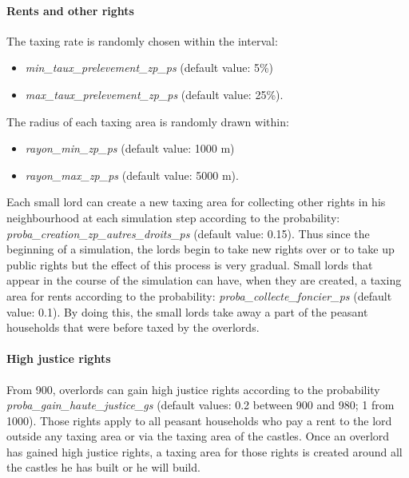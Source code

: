 \documentclass[a4paper,11pt]{article}
\begin{document}
{\paragraph{Rents and other rights}
\begin{sloppypar}
The taxing rate is randomly chosen within the interval:
\begin{itemize}
  \item \textit{min\_taux\_prelevement\_zp\_ps} (default value: 5\%)
  \item \textit{max\_taux\_prelevement\_zp\_ps} (default value: 25\%).
\end{itemize}
The radius of each taxing area is randomly drawn within:
\begin{itemize}
  \item \textit{rayon\_min\_zp\_ps} (default value: 1000 m)
  \item   \textit{rayon\_max\_zp\_ps} (default value: 5000 m).
\end{itemize}
Each small lord can create a new taxing area for collecting other rights in his neighbourhood at each simulation step according to the probability:
\textit{proba\_creation\_zp\_autres\_droits\_ps} (default value: 0.15). Thus since the beginning of a simulation, the lords begin to take new rights over or to take up public rights but the effect of this process is very gradual. Small lords that appear in the course of the simulation can have, when they are created, a taxing area for rents according to the probability:
\textit{proba\_collecte\_foncier\_ps} (default value: 0.1). By doing this, the small lords take away a part of the peasant households that were before taxed by the overlords.
\end{sloppypar}


\paragraph{High justice rights}
\begin{sloppypar}
From 900, overlords can gain high justice rights according to the probability \textit{proba\_gain\_haute\_justice\_gs} (default values: 0.2 between 900 and 980; 1 from 1000). Those rights apply to all peasant households who pay a rent to the lord outside any taxing area or via the taxing area of the castles. Once an overlord has gained high justice rights, a taxing area for those rights is created around all the castles he has built or he will build.


\end{sloppypar}}
\end{document}
